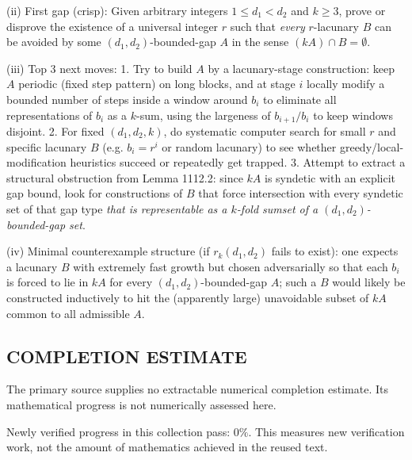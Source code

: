(ii) First gap (crisp): Given arbitrary integers \(1\le d_1<d_2\) and \(k\ge 3\), prove or disprove the existence of a universal integer \(r\) such that \emph{every} \(r\)-lacunary \(B\) can be avoided by some \((d_1,d_2)\)-bounded-gap \(A\) in the sense \((kA)\cap B=\emptyset\).

(iii) Top 3 next moves:
1. Try to build \(A\) by a lacunary-stage construction: keep \(A\) periodic (fixed step pattern) on long blocks, and at stage \(i\) locally modify a bounded number of steps inside a window around \(b_i\) to eliminate all representations of \(b_i\) as a \(k\)-sum, using the largeness of \(b_{i+1}/b_i\) to keep windows disjoint.
2. For fixed \((d_1,d_2,k)\), do systematic computer search for small \(r\) and specific lacunary \(B\) (e.g. \(b_i=r^i\) or random lacunary) to see whether greedy/local-modification heuristics succeed or repeatedly get trapped.
3. Attempt to extract a structural obstruction from Lemma 1112.2: since \(kA\) is syndetic with an explicit gap bound, look for constructions of \(B\) that force intersection with every syndetic set of that gap type \emph{that is representable as a \(k\)-fold sumset of a \((d_1,d_2)\)-bounded-gap set}.

(iv) Minimal counterexample structure (if \(r_k(d_1,d_2)\) fails to exist): one expects a lacunary \(B\) with extremely fast growth but chosen adversarially so that each \(b_i\) is forced to lie in \(kA\) for every \((d_1,d_2)\)-bounded-gap \(A\); such a \(B\) would likely be constructed inductively to hit the (apparently large) unavoidable subset of \(kA\) common to all admissible \(A\).




\subsection*{COMPLETION ESTIMATE}
The primary source supplies no extractable numerical completion estimate. Its mathematical progress is not numerically assessed here.

Newly verified progress in this collection pass: $0\%$. This measures new verification work, not the amount of mathematics achieved in the reused text.
